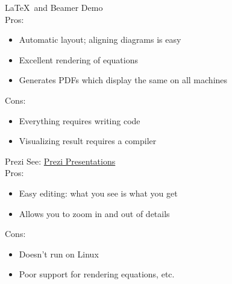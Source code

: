 \documentclass{beamer}
\begin{document}
\begin{frame}{\LaTeX\ and Beamer}
Demo\\
\bigskip
Pros:
\begin{itemize}
\item Automatic layout; aligning diagrams is easy
\item Excellent rendering of equations
\item Generates PDFs which display the same on all machines
\end{itemize}
Cons:
\begin{itemize}
\item Everything requires writing code
\item Visualizing result requires a compiler
\end{itemize}
\end{frame}

\begin{frame}{Prezi}
See: \href{http://prezi.com/c9pdlrpx3pr6/copy-of-presentation-on-presentations/}{Prezi Presentations}\\
\bigskip
Pros:
\begin{itemize}
\item Easy editing: what you see is what you get
\item Allows you to zoom in and out of details
\end{itemize}
Cons:
\begin{itemize}
\item Doesn't run on Linux
\item Poor support for rendering equations, etc.
\end{itemize}
\end{frame}
\end{document}
